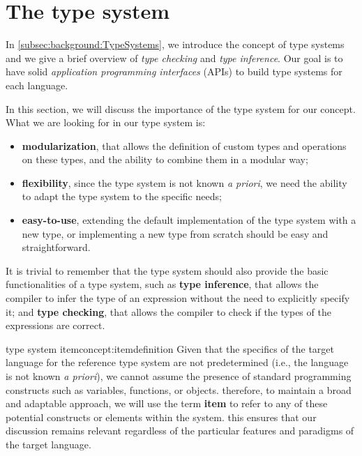 \section{The type system}\label{sec:concept:TheTypeSystem}

In \ref{subsec:background:TypeSystems}, we introduce the concept of type systems and we give a brief overview of \textit{type checking} and \textit{type inference}. Our goal is to have solid \textit{application programming interfaces} (APIs) to build type systems for each language.

In this section, we will discuss the importance of the type system for our concept.
What we are looking for in our type system is:
\begin{itemize}
    \item \textbf{modularization}, that allows the definition of custom types and operations on these types, and the ability to combine them in a modular way;
    \item \textbf{flexibility}, since the type system is not known \textit{a priori}, we need the ability to adapt the type system to the specific needs;
    \item \textbf{easy-to-use}, extending the default implementation of the type system with a new type, or implementing a new type from scratch should be easy and straightforward.
\end{itemize}

It is trivial to remember that the type system should also provide the basic functionalities of a type system, such as \textbf{type inference}, that allows the compiler to infer the type of an expression without the need to explicitly specify it; and \textbf{type checking}, that allows the compiler to check if the types of the expressions are correct.

\begin{mydefinition}{type system item}{concept:itemdefinition}
    Given that the specifics of the target language for the reference type system are not predetermined (i.e., the language is not known \textit{a priori}), we cannot assume the presence of standard programming constructs such as variables, functions, or objects. therefore, to maintain a broad and adaptable approach, we will use the term \textbf{item} to refer to any of these potential constructs or elements within the system. this ensures that our discussion remains relevant regardless of the particular features and paradigms of the target language.
\end{mydefinition}

